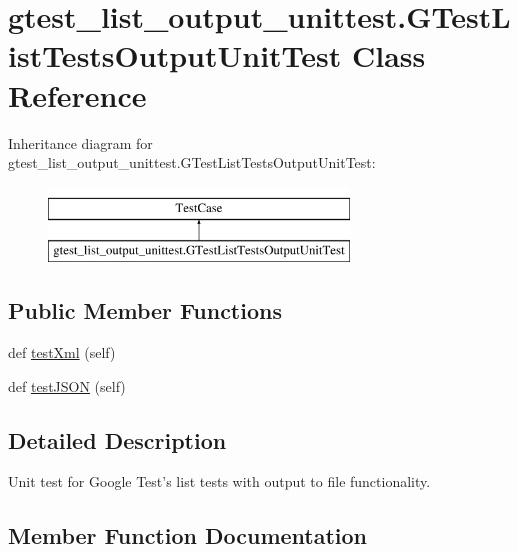 \hypertarget{classgtest__list__output__unittest_1_1GTestListTestsOutputUnitTest}{}\section{gtest\+\_\+list\+\_\+output\+\_\+unittest.\+G\+Test\+List\+Tests\+Output\+Unit\+Test Class Reference}
\label{classgtest__list__output__unittest_1_1GTestListTestsOutputUnitTest}
Inheritance diagram for gtest\+\_\+list\+\_\+output\+\_\+unittest.\+G\+Test\+List\+Tests\+Output\+Unit\+Test\+:\begin{figure}[H]
\begin{center}
\leavevmode
\includegraphics[height=2.000000cm]{classgtest__list__output__unittest_1_1GTestListTestsOutputUnitTest}
\end{center}
\end{figure}
\subsection*{Public Member Functions}
\begin{DoxyCompactItemize}
\item 
def \mbox{\hyperlink{classgtest__list__output__unittest_1_1GTestListTestsOutputUnitTest_ad3088bc8ee3a0abdabbf1b90507e272e}{test\+Xml}} (self)
\item 
def \mbox{\hyperlink{classgtest__list__output__unittest_1_1GTestListTestsOutputUnitTest_a99bc0627a969b4c7b63ed91e8f187637}{test\+J\+S\+ON}} (self)
\end{DoxyCompactItemize}


\subsection{Detailed Description}
\begin{DoxyVerb}Unit test for Google Test's list tests with output to file functionality.
\end{DoxyVerb}
 

\subsection{Member Function Documentation}
\mbox{\label{classgtest__list__output__unittest_1_1GTestListTestsOutputUnitTest_a99bc0627a969b4c7b63ed91e8f187637}} 
